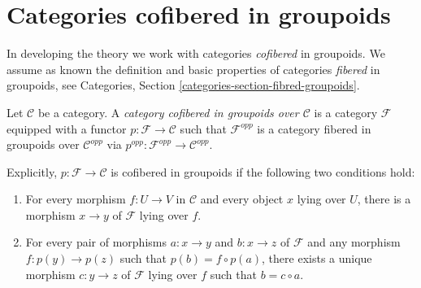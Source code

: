 \section{Categories cofibered in groupoids}
\label{section-preliminary}

\noindent
In developing the theory we work with categories {\it cofibered} in groupoids.
 We assume as known the definition and basic properties of categories
{\it fibered} in groupoids, see
Categories, Section \ref{categories-section-fibred-groupoids}.

\begin{definition}
\label{definition-category-cofibred-groupoids}
Let $\mathcal{C}$ be a category.  A {\it category cofibered in groupoids over
$\mathcal{C}$} is a category $\mathcal{F}$ equipped with a functor
$p: \mathcal{F} \to \mathcal{C}$ such that $\mathcal{F}^{opp}$ is a category
fibered in groupoids over $\mathcal{C}^{opp}$ via
$p^{opp}: \mathcal{F}^{opp} \to \mathcal{C}^{opp}$.
\end{definition}

\noindent
Explicitly, $p: \mathcal{F} \to \mathcal{C}$ is cofibered in groupoids if
the following two conditions hold:
\begin{enumerate}
\item For every morphism $f: U \to V$ in $\mathcal{C}$ and every object
$x$ lying over $U$, there is a morphism $x \to y$ of $\mathcal{F}$ lying
over $f$.
\item For every pair of morphisms $a: x \to y$ and $b: x \to z$
of $\mathcal{F}$ and any morphism $f: p(y) \to p(z)$ such that $p(b) = f
\circ p(a)$, there exists a unique morphism $c: y \to z$ of $\mathcal
F$ lying over $f$ such that $b = c \circ a$.
\end{enumerate}

